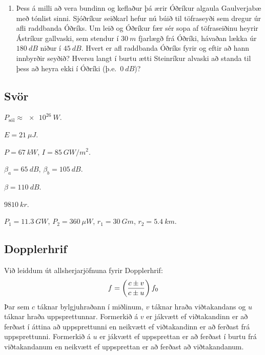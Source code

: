 \ifdefined \wholebook \else\documentclass[oneside]{book}\usepackage{EdlBook}\graphicspath{{figures/}}
\begin{document}
\begin{enumerate}[label = \textbf{Dæmi \thechapter.\arabic*.}]
\item Þess á milli að vera bundinn og keflaður þá ærir Óðríkur algaula Gaulverjabæ með tónlist sinni. Sjóðríkur seiðkarl hefur nú búið til töfraseyði sem dregur úr afli raddbanda Óðríks. Um leið og Óðríkur fær sér sopa af töfraseiðinu heyrir Ástríkur gallvaski, sem stendur í $\SI{30}{m}$ fjarlægð frá Óðríki, hávaðan lækka úr $\SI{180}{dB}$ niður í $\SI{45}{dB}$. Hvert er afl raddbanda Óðríks fyrir og eftir að hann innbyrðir seyðið? Hversu langt í burtu ætti Steinríkur alvaski að standa til þess að heyra ekki í Óðríki (þ.e.~$\SI{0}{dB}$)?

\end{enumerate}

\subsection*{Svör}

\begin{enumerate*}[label = \vspace{0.15cm} \textbf{(\arabic*)}]
    \setcounter{enumi}{14}
    \item $P_{\text{sól}} \approx \SI{e26}{W}$.
    \item $E = \SI{21}{\mu J}$.
    \item $P = \SI{67}{kW}$, $I = \SI{85}{GW/m^2}$.
    \item $\beta_a = \SI{65}{dB}$, $\beta_b = \SI{105}{dB}$.
    \item $\beta = \SI{110}{dB}$.
    \item $\SI{9810}{kr}$.
    \item $P_1 = \SI{11.3}{GW}$, $P_2 = \SI{360}{\mu W}$, $r_1 = \SI{30}{Gm}$, $r_2  = \SI{5.4}{km}$.
\end{enumerate*}


\subsection*{Dopplerhrif} 

\begin{tcolorbox}
Við leiddum út allsherjarjöfnuna fyrir Dopplerhrif:
\begin{align*} \vspace{-0.2cm}
    f = \left( \frac{c \pm v}{c \pm u} \right)f_0
\end{align*}
Þar sem $c$ táknar bylgjuhraðann í miðlinum, $v$ táknar hraða viðtakandans og $u$ táknar hraða uppsprettunnar. Formerkið á $v$ er jákvætt ef viðtakandinn er að ferðast í áttina að uppsprettunni en neikvætt ef viðtakandinn er að ferðast frá uppsprettunni. Formerkið á $u$ er jákvætt ef uppsprettan er að ferðast í burtu frá viðtakandanum en neikvætt ef uppsprettan er að ferðast að viðtakandanum.
\end{tcolorbox}
\end{document}
